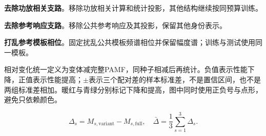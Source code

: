 \documentclass[10pt,journal]{IEEEtran}
\begin{document}
\noindent\textbf{去除功放相关支路}。移除功放相关计算和统计投影，其他结构继续按同预算训练。\par

\noindent\textbf{去除参考响应支路}。移除公共参考响应及其投影，保留其他身份表示。\par

\noindent\textbf{打乱参考模板相位}。固定扰乱公共模板频谱相位并保留幅度谱；训练与测试使用同一模板。\par

相对变化统一定义为变体减完整PAMF，同种子相减后再统计。负值表示性能下降，正值表示性能提高；\ensuremath{\pm}表示三个配对差的样本标准差，不是置信区间，也不是两组标准差相加。暖红与青绿分别标记下降和提高，图中同时使用正负号与点形，避免只依赖颜色。

\begin{equation}\Delta_{s}=M_{s,\mathrm{variant}}-M_{s,\mathrm{full}},\quad \bar\Delta=\frac{1}{3}\sum_{s=1}^{3}\Delta_s.\end{equation}
\end{document}
